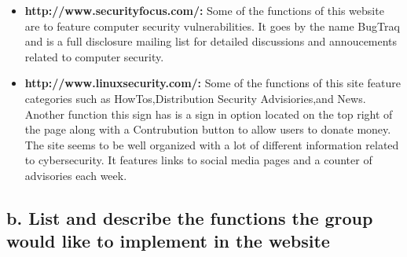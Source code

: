 \documentclass{article}
\begin{document}
\begin{itemize}
    \item %
    \textbf{http://www.securityfocus.com/:} 
    Some of the functions of this website are to feature computer security vulnerabilities. It goes by the name BugTraq and is a full disclosure mailing list
    for detailed discussions and annoucements related to computer security.
    \item %
    \textbf{http://www.linuxsecurity.com/:}
    Some of the functions of this site feature categories such as HowTos,Distribution Security Advisiories,and News.
         Another function this sign has is a sign in option located on the top right of the page along with a Contrubution button to allow users to donate money.
         The site seems to be well organized with a lot of different information related to cybersecurity. 
         It features links to social media pages and a counter of advisories each week.
\end{itemize}



\subsection{b. List and describe the functions the group would like to implement in the website}
\end{document}
